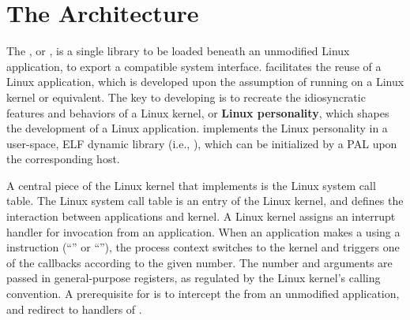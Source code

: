 \section{The \thelibos{} Architecture}


The \graphene{} \libos{}, or \thelibos{},
is a single library to be loaded beneath an unmodified Linux application,
to export a compatible system interface.
\thelibos{} facilitates the reuse of
a Linux application,
which is developed upon the assumption of running on a Linux kernel or equivalent.
The key to developing \thelibos{}
is to recreate the
idiosyncratic features and behaviors of a Linux kernel,
or {\bf Linux personality},
which shapes the development of a Linux application.
\thelibos{} implements the Linux personality in a user-space, ELF dynamic library (i.e., ),
which can be initialized by a PAL upon the corresponding host.


A central piece of the Linux kernel that \thelibos{} implements is the Linux system call table.
The Linux system call table is
an entry of the Linux kernel,
and defines the interaction between applications and kernel.
A Linux kernel assigns
an interrupt handler for \linuxapi{} invocation from an application.
When an application makes a \linuxapi{} using a \graphenearch{} instruction (``'' or ``''),
the process
context switches to the kernel
and triggers one of the \linuxapi{} callbacks according to the given \linuxapi{} number.
The \linuxapi{} number and arguments
are passed in \graphenearch{} general-purpose registers, as regulated by the Linux kernel's calling convention.
A prerequisite for \thelibos{}
is to intercept the \linuxapis{} from an unmodified application,
and redirect %
to \linuxapi{} handlers of \thelibos{}.


